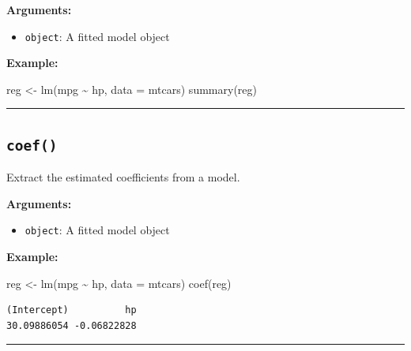 \documentclass[
  letterpaper,
  DIV=11,
  numbers=noendperiod]{scrreprt}
\newenvironment{Shaded}{\begin{snugshade}}{\end{snugshade}}
\newcommand{\AttributeTok}[1]{\textcolor[rgb]{0.40,0.45,0.13}{#1}}
\newcommand{\FunctionTok}[1]{\textcolor[rgb]{0.28,0.35,0.67}{#1}}
\newcommand{\NormalTok}[1]{\textcolor[rgb]{0.00,0.23,0.31}{#1}}
\newcommand{\OtherTok}[1]{\textcolor[rgb]{0.00,0.23,0.31}{#1}}
\newcommand{\SpecialCharTok}[1]{\textcolor[rgb]{0.37,0.37,0.37}{#1}}
\providecommand{\tightlist}{%
  \setlength{\itemsep}{0pt}\setlength{\parskip}{0pt}}
\begin{document}
\textbf{Arguments:}

\begin{itemize}
\tightlist
\item
  \texttt{object}: A fitted model object
\end{itemize}

\textbf{Example:}

\begin{Shaded}
\begin{Highlighting}[]
\NormalTok{reg }\OtherTok{\textless{}{-}} \FunctionTok{lm}\NormalTok{(mpg }\SpecialCharTok{\textasciitilde{}}\NormalTok{ hp, }\AttributeTok{data =}\NormalTok{ mtcars)}
\FunctionTok{summary}\NormalTok{(reg)}
\end{Highlighting}
\end{Shaded}

\begin{center}\rule{0.5\linewidth}{0.5pt}\end{center}

\subsection{\texorpdfstring{\texttt{coef()}}{coef()}}\label{coef}

Extract the estimated coefficients from a model.

\textbf{Arguments:}

\begin{itemize}
\tightlist
\item
  \texttt{object}: A fitted model object
\end{itemize}

\textbf{Example:}

\begin{Shaded}
\begin{Highlighting}[]
\NormalTok{reg }\OtherTok{\textless{}{-}} \FunctionTok{lm}\NormalTok{(mpg }\SpecialCharTok{\textasciitilde{}}\NormalTok{ hp, }\AttributeTok{data =}\NormalTok{ mtcars)}
\FunctionTok{coef}\NormalTok{(reg)}
\end{Highlighting}
\end{Shaded}

\begin{verbatim}
(Intercept)          hp 
30.09886054 -0.06822828 
\end{verbatim}

\begin{center}\rule{0.5\linewidth}{0.5pt}\end{center}
\end{document}
